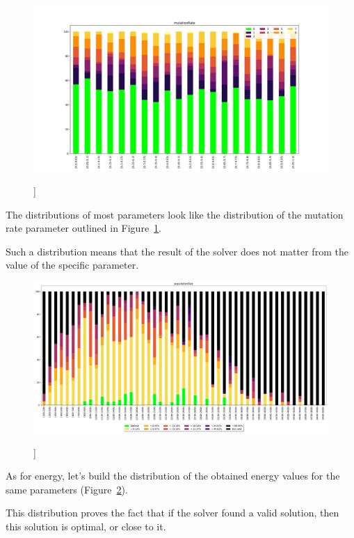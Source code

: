 \begin{figure}
	\centering
	\includegraphics[width=\textwidth]{images/mutationRate_gradient_500dpi.png}
	\caption[]]{}
	\label{fig:mutationRate_gradient}
\end{figure}
The distributions of most parameters look like the distribution of the mutation rate parameter outlined in Figure~\ref{fig:mutationRate_gradient}.

Such a distribution means that the result of the solver does not matter from the value of the specific parameter.
\begin{figure}
	\centering
	\includegraphics[width=\textwidth]{images/populationSizeObjective.pdf}
	\caption[]]{}
	\label{fig:populationSizeObjective}
\end{figure}
As for energy, let's build the distribution of the obtained energy values for the same parameters (Figure~\ref{fig:populationSizeObjective}).

This distribution proves the fact that if the solver found a valid solution, then this solution is optimal, or close to it.
